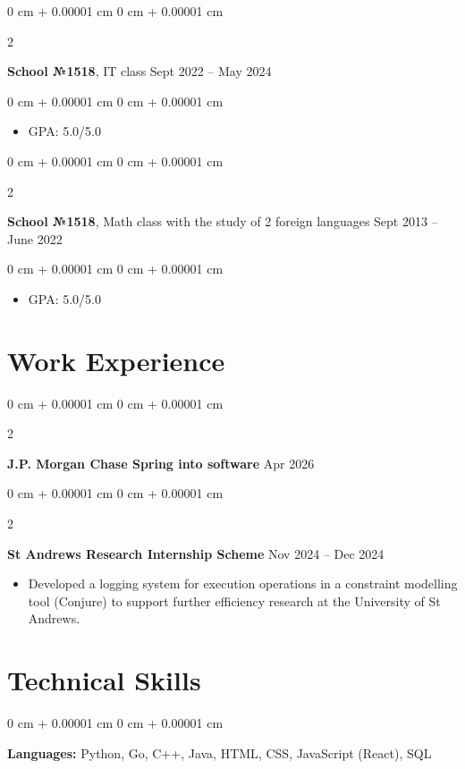 \documentclass[10pt, letterpaper]{article}
\newenvironment{highlights}{
    \begin{itemize}[
        topsep=0.10 cm,
        parsep=0.10 cm,
        partopsep=0pt,
        itemsep=0pt,
        leftmargin=0 cm + 10pt
    ]
}{
    \end{itemize}
} %
\newenvironment{onecolentry}{
    \begin{adjustwidth}{
        0 cm + 0.00001 cm
    }{
        0 cm + 0.00001 cm
    }
}{
    \end{adjustwidth}
} %
\newenvironment{twocolentry}[2][]{
    \onecolentry
    \def\secondColumn{#2}
    \setcolumnwidth{\fill, 4.5 cm}
    \begin{paracol}{2}
}{
    \switchcolumn \raggedleft \secondColumn
    \end{paracol}
    \endonecolentry
} %
\begin{document}
        \begin{twocolentry}{
            Sept 2022 – May 2024
        }
            \textbf{School №1518}, IT class\end{twocolentry}

        \vspace{0.10 cm}
        \begin{onecolentry}
            \begin{highlights}
                \item GPA: 5.0/5.0 
            \end{highlights}
        \end{onecolentry}

        \vspace{0.10 cm}

        \begin{twocolentry}{
            Sept 2013 – June 2022
        }
            \textbf{School №1518}, Math class with the study of 2 foreign languages\end{twocolentry}

        \vspace{0.10 cm}
        \begin{onecolentry}
            \begin{highlights}
                \item GPA: 5.0/5.0 
            \end{highlights}
        \end{onecolentry}

    \section{Work Experience}
        \begin{twocolentry}{
            Apr 2026
        }
            \textbf{J.P. Morgan Chase Spring into software}\end{twocolentry}
        \begin{twocolentry}{
            Nov 2024 – Dec 2024
        }
            \textbf{St Andrews Research Internship Scheme}\end{twocolentry}
        \begin{highlights}
            \item Developed a logging system for execution operations in a constraint modelling tool (Conjure) to support further efficiency research at the University of St Andrews.
        \end{highlights}


    \section{Technical Skills}
        \begin{onecolentry}
            \textbf{Languages:} Python, Go, C++, Java, HTML, CSS, JavaScript (React), SQL
        \end{onecolentry}
        
\end{document}
